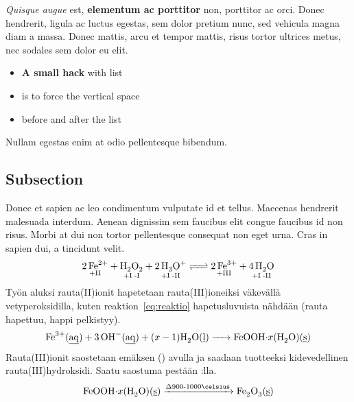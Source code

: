 \documentclass[11pt,a4paper,oneside,article]{memoir}
\newcommand\reaction[1]{\begin{equation}\ce{#1}\end{equation}} %
\begin{document}
\textit{Quisque augue} est, \textbf{elementum ac porttitor} non, porttitor ac orci. Donec hendrerit, ligula ac luctus egestas, sem dolor pretium nunc, sed vehicula magna diam a massa. Donec mattis, arcu et tempor mattis, risus tortor ultrices metus, nec sodales sem dolor eu elit.\vspace{-17pt} 
\begin{itemize}
\item \textbf{A small hack} with list
\item is to force the vertical space 
\item before and after the list
\end{itemize}
\vspace{-17pt} Nullam egestas enim at odio pellentesque bibendum. 

\subsection{Subsection}
Donec et sapien ac leo condimentum vulputate id et tellus. Maecenas hendrerit malesuada interdum. Aenean dignissim sem faucibus elit congue faucibus id non risus. Morbi at dui non tortor pellentesque consequat non eget urna. Cras in sapien dui, a tincidunt velit.
\reaction{\label{eq:reaktio}$\underset{\text{+II}}{\ce{2Fe^2+}}$ + $\underset{\text{+I\;-I}}{\ce{H2O2}}$ + $\underset{\text{+I\;-II}}{\ce{2H3O^+}}$ <=> $\underset{\text{+III}}{\ce{2Fe^3+}}$ + $\underset{\text{+I\;-II}}{\ce{4H2O}}$}
Työn aluksi rauta(II)ionit hapetetaan rauta(III)ioneiksi väkevällä vetyperoksidilla, kuten reaktion~\ref{eq:reaktio} hapetusluvuista nähdään (rauta hapettuu, happi pelkistyy).  
\reaction{Fe^3+( \emph{aq} ) + 3OH^-( \emph{aq} ) + $(x-1)$H2O( \emph{l} ) -> FeOOH $\cdot$ $x$(H2O)( \emph{s} )}
Rauta(III)ionit saostetaan emäksen () avulla ja saadaan tuotteeksi kidevedellinen rauta(III)hydroksidi. Saatu saostuma pestään :lla.
\reaction{FeOOH $\cdot$ $x$(H2O)( \emph{s} ) ->T[$\Delta$900-1000\celsius] Fe2O3( \emph{s} )}
\end{document}

